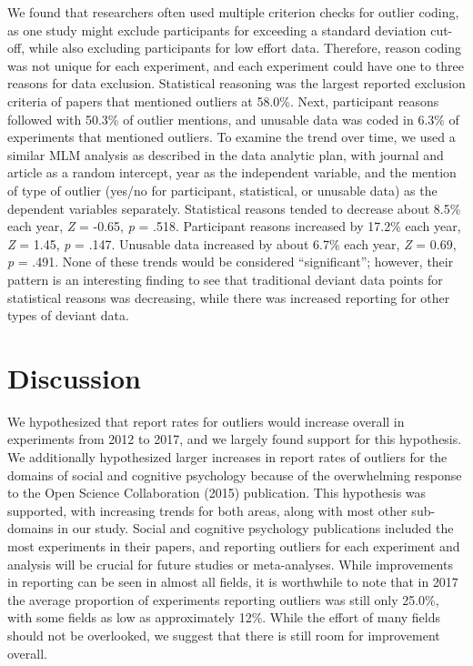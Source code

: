 \documentclass[english,,man]{apa6}
\theoremstyle{definition}
\theoremstyle{definition}
\theoremstyle{definition}
\theoremstyle{remark}
\begin{document}
We found that researchers often used multiple criterion checks for
outlier coding, as one study might exclude participants for exceeding a
standard deviation cut-off, while also excluding participants for low
effort data. Therefore, reason coding was not unique for each
experiment, and each experiment could have one to three reasons for data
exclusion. Statistical reasoning was the largest reported exclusion
criteria of papers that mentioned outliers at 58.0\%. Next, participant
reasons followed with 50.3\% of outlier mentions, and unusable data was
coded in 6.3\% of experiments that mentioned outliers. To examine the
trend over time, we used a similar MLM analysis as described in the data
analytic plan, with journal and article as a random intercept, year as
the independent variable, and the mention of type of outlier (yes/no for
participant, statistical, or unusable data) as the dependent variables
separately. Statistical reasons tended to decrease about 8.5\% each
year, \emph{Z} = -0.65, \emph{p} = .518. Participant reasons increased
by 17.2\% each year, \emph{Z} = 1.45, \emph{p} = .147. Unusable data
increased by about 6.7\% each year, \emph{Z} = 0.69, \emph{p} = .491.
None of these trends would be considered \enquote{significant}; however,
their pattern is an interesting finding to see that traditional deviant
data points for statistical reasons was decreasing, while there was
increased reporting for other types of deviant data.

\section{Discussion}\label{discussion}

We hypothesized that report rates for outliers would increase overall in
experiments from 2012 to 2017, and we largely found support for this
hypothesis. We additionally hypothesized larger increases in report
rates of outliers for the domains of social and cognitive psychology
because of the overwhelming response to the Open Science Collaboration
(2015) publication. This hypothesis was supported, with increasing
trends for both areas, along with most other sub-domains in our study.
Social and cognitive psychology publications included the most
experiments in their papers, and reporting outliers for each experiment
and analysis will be crucial for future studies or meta-analyses. While
improvements in reporting can be seen in almost all fields, it is
worthwhile to note that in 2017 the average proportion of experiments
reporting outliers was still only 25.0\%, with some fields as low as
approximately 12\%. While the effort of many fields should not be
overlooked, we suggest that there is still room for improvement overall.
\end{document}
